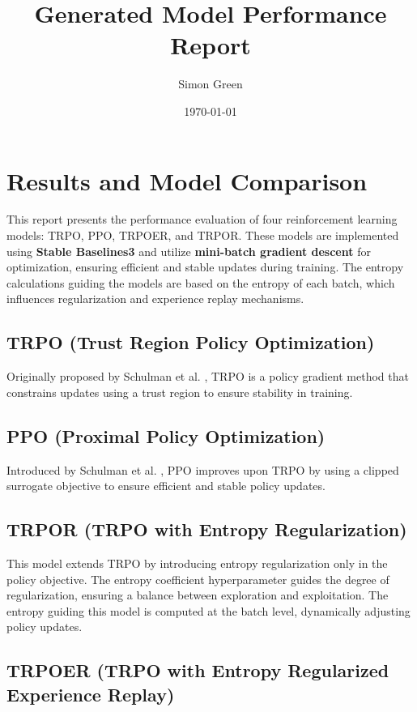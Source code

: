 \documentclass{article}
\begin{document}
\title{Generated Model Performance Report}
\author{Simon Green}
\date{\today}
\maketitle

\section{Results and Model Comparison} 

This report presents the performance evaluation of four reinforcement learning models: TRPO, PPO, TRPOER, and TRPOR. These models are implemented using \textbf{Stable Baselines3} and utilize \textbf{mini-batch gradient descent} for optimization, ensuring efficient and stable updates during training. The entropy calculations guiding the models are based on the entropy of each batch, which influences regularization and experience replay mechanisms. 


\subsection{TRPO (Trust Region Policy Optimization)}

Originally proposed by Schulman et al. \cite{schulman2015trust}, TRPO is a policy gradient method that constrains updates using a trust region to ensure stability in training.

\subsection{PPO (Proximal Policy Optimization)}

Introduced by Schulman et al. \cite{schulman2017proximal}, PPO improves upon TRPO by using a clipped surrogate objective to ensure efficient and stable policy updates.

\subsection{TRPOR (TRPO with Entropy Regularization)}

This model extends TRPO by introducing entropy regularization only in the policy objective. The entropy coefficient hyperparameter guides the degree of regularization, ensuring a balance between exploration and exploitation. The entropy guiding this model is computed at the batch level, dynamically adjusting policy updates.

\subsection{TRPOER (TRPO with Entropy Regularized Experience Replay)}
\end{document}
